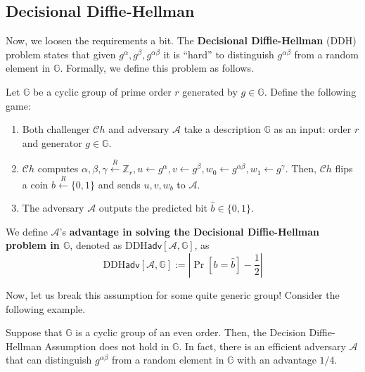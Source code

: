 \documentclass[../lecture-notes-148x210.tex]{subfiles}
\begin{document}
\subsection{Decisional Diffie-Hellman}

Now, we loosen the requirements a bit. The \textbf{Decisional Diffie-Hellman} (DDH) problem states that given $g^{\alpha},g^{\beta},g^{\alpha\beta}$ it is ``hard'' to distinguish $g^{\alpha\beta}$ from a random element in $\mathbb{G}$. Formally, we define this problem as follows.

\begin{definition}
    Let $\mathbb{G}$ be a cyclic group of prime order $r$ generated by $g \in \mathbb{G}$. Define the following game:
    \begin{enumerate}
        \item Both challenger $\mathcal{C}h$ and adversary $\mathcal{A}$ take a description $\mathbb{G}$ as an input: order $r$ and generator $g \in \mathbb{G}$.
        \item $\mathcal{C}h$ computes $\alpha, \beta,\gamma \xleftarrow{R} \mathbb{Z}_r, u \gets g^{\alpha}, v \gets g^{\beta}, w_0 \gets g^{\alpha\beta}, w_1 \gets g^{\gamma}$. Then, $\mathcal{C}h$ flips a coin $b \xleftarrow{R} \{0,1\}$ and sends $u,v,w_b$ to $\mathcal{A}$.
        \item The adversary $\mathcal{A}$ outputs the predicted bit $\hat{b} \in \{0,1\}$.
    \end{enumerate}

    We define $\mathcal{A}$'s \textbf{advantage in solving the Decisional Diffie-Hellman problem in $\mathbb{G}$}, denoted as $\text{DDH}\mathsf{adv}[\mathcal{A},\mathbb{G}]$, as
    \begin{equation*}
        \text{DDH}\mathsf{adv}[\mathcal{A},\mathbb{G}] := \left| \Pr[b = \hat{b}] - \frac{1}{2} \right|
    \end{equation*}
\end{definition}

Now, let us break this assumption for some quite generic group! Consider the following example.

\begin{theorem}
    Suppose that $\mathbb{G}$ is a cyclic group of an even order. Then, the Decision
    Diffie-Hellman Assumption does not hold in $\mathbb{G}$. In fact, there is an efficient adversary $\mathcal{A}$ that can distinguish $g^{\alpha\beta}$ from a random element in $\mathbb{G}$ with an advantage $1/4$.
\end{theorem}
\end{document}
